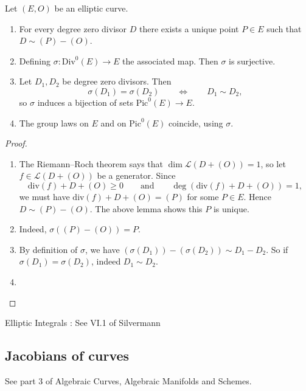 \begin{proposition}
    Let $(E, O)$ be an elliptic curve.
    \begin{enumerate}[label=(\roman*)]
        \item For every degree zero divisor $D$ there exists a unique point $P \in E$ such that $D \sim{} (P) - (O)$.
        
        \item Defining $\sigma : \text{Div}^0(E) \to E$ the associated map. Then $\sigma$ is surjective.
        
        \item Let $D_1, D_2$ be degree zero divisors. Then
        \[ \sigma(D_1) = \sigma(D_2) \qquad \iff \qquad D_1 \sim{} D_2 , \]
        so $\sigma$ induces a bijection of sets $\text{Pic}^0(E) \to E$.
        
        \item The group laws on $E$ and on $\text{Pic}^0(E)$ coincide, using $\sigma$.
    \end{enumerate}
\end{proposition}
\begin{proof}
    \begin{enumerate}[label=(\roman*)]
        \item The Riemann--Roch theorem says that $\dim \mathcal{L}(D + (O)) = 1$, so let $f \in \mathcal{L}(D + (O))$ be a generator. Since
        \[ \text{div}(f) + D + (O) \ge 0 \qquad \text{and} \qquad \deg(\text{div}(f) + D + (O)) = 1, \]
        we must have $\text{div}(f) + D + (O) = (P)$ for some $P \in E$. Hence $D \sim{} (P) - (O)$. The above lemma shows this $P$ is unique.
        
        \item Indeed, $\sigma((P) - (O)) = P$.
        
        \item By definition of $\sigma$, we have $(\sigma(D_1)) - (\sigma(D_2)) \sim{} D_1 - D_2$. So if $\sigma(D_1) = \sigma(D_2)$, indeed $D_1 \sim{} D_2$.
        
        \item {}
    \end{enumerate}
\end{proof}

Elliptic Integrals : See VI.1 of Silvermann

\subsection{Jacobians of curves}

See part 3 of Algebraic Curves, Algebraic Manifolds and Schemes.
